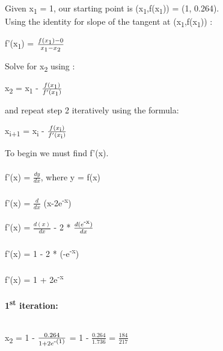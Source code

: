 \documentclass{report}
\begin{document}
             Given x\textsubscript{1} = 1, our starting point is (x\textsubscript{1},f(x\textsubscript{1})) = (1, 0.264).\\
             Using the identity for slope of the tangent at (x\textsubscript{1},f(x\textsubscript{1})) :
             
             \begin{center}
                 f'(x\textsubscript{1}) = $\frac{f(x\textsubscript{1}) - 0}{x\textsubscript{1} - x\textsubscript{2}}$
             \end{center}

             Solve for x\textsubscript{2} using : 

             \begin{center}
                x\textsubscript{2} = x\textsubscript{1} - $\frac{f(x\textsubscript{1})}{f'(x\textsubscript{1})}$
            \end{center}

            and repeat step 2 iteratively using the formula:


            \begin{center}
                x\textsubscript{i+1} = x\textsubscript{i} - $\frac{f(x\textsubscript{i})}{f'(x\textsubscript{i})}$
            \end{center}


            To begin we must find f'(x).\\\\
            f'(x) = $\frac{dy}{dx}$, where y = f(x)\\\\
            f'(x) = $\frac{d}{dx}$ (x-2e\textsuperscript{-x})\\\\
            f'(x) = $\frac{d(x)}{dx}$ - 2 * $\frac{d(e\textsuperscript{-x})}{dx}$\\\\
            f'(x) = 1 - 2 * (-e\textsuperscript{-x})\\\\
            f'(x) = 1 + 2e\textsuperscript{-x}\\\\

            \textbf{1\textsuperscript{st} iteration:}\\\\
            \begin{center}
                x\textsubscript{2} = 1 - $\frac{0.264}{1+2e\textsuperscript{-(1)}}$ = 1 - $\frac{0.264}{1.736}$ = $\frac{184}{217}$    
            \end{center}
\end{document}
